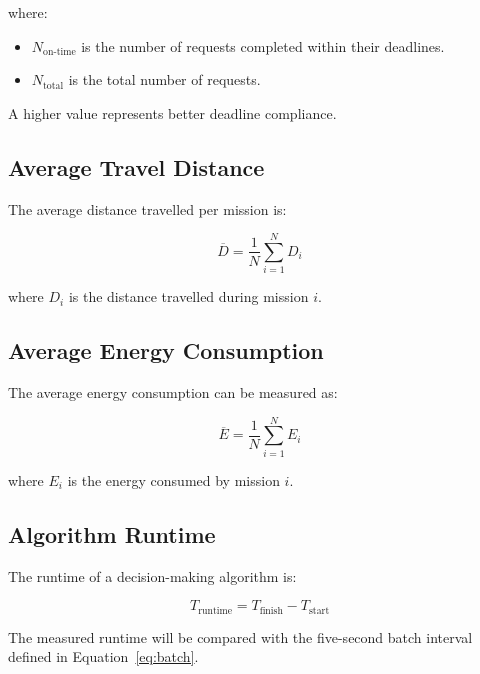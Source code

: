 \documentclass[12pt,a4paper]{article}
\begin{document}
where:

\begin{itemize}
    \item $N_{\mathrm{on\text{-}time}}$ is the number of requests
    completed within their deadlines.
    \item $N_{\mathrm{total}}$ is the total number of requests.
\end{itemize}

A higher value represents better deadline compliance.

\subsection{Average Travel Distance}

The average distance travelled per mission is:

\begin{equation}
    \overline{D}
    =
    \frac{1}{N}
    \sum_{i=1}^{N}D_i
    \label{eq:avgdistance}
\end{equation}

where $D_i$ is the distance travelled during mission $i$.

\subsection{Average Energy Consumption}

The average energy consumption can be measured as:

\begin{equation}
    \overline{E}
    =
    \frac{1}{N}
    \sum_{i=1}^{N}E_i
    \label{eq:avgen}
\end{equation}

where $E_i$ is the energy consumed by mission $i$.

\subsection{Algorithm Runtime}

The runtime of a decision-making algorithm is:

\begin{equation}
    T_{\mathrm{runtime}}
    =
    T_{\mathrm{finish}}
    -
    T_{\mathrm{start}}
    \label{eq:runtime}
\end{equation}

The measured runtime will be compared with the five-second batch
interval defined in Equation~\eqref{eq:batch}.
\end{document}

